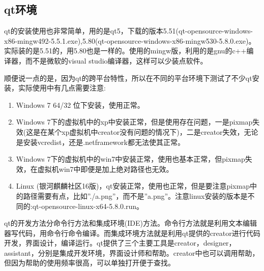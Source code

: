 \documentclass[11pt,twoside]{article} %
\begin{document}
\subsection{qt环境}
qt的安装使用也非常简单，用的是qt5，下载的版本5.51(qt-opensource-windows-x86-mingw492-5.5.1.exe),5.80(qt-opensource-windows-x86-mingw530-5.8.0.exe)。 实际装的是5.51的，用5.80也是一样的。使用的mingw版，利用的是gnu的c++编译器，而不是微软的visual studio编译器，这样可以少装点软件。

顺便说一点的是，因为qt的跨平台特性，所以在不同的平台环境下测试了不少qt安装，实际使用中有几点需要注意:
\begin{enumerate}
  \item Windows 7 64/32 位下安装，使用正常。
  \item Windows 7下的虚拟机中的xp中安装正常，但是使用存在问题，一是pixmap失效(这是在某个xp虚拟机中creator没有问题的情况下)，二是creator失效，无论是安装vcredist，还是.netframework都无法使其正常。
  \item Windows 7下的虚拟机中的win7中安装正常，使用也基本正常，但pixmap失效，在虚拟机win7中即便是加上绝对路径也无效。
  \item Linux (银河麒麟社区16版)，qt安装正常，使用也正常，但是要注意pixmap中的路径需要有点，比如”./a.png”，而不是”a.png”。注意linux安装的版本是不同的:qt-opensource-linux-x64-5.8.0.run。
\end{enumerate}

qt的开发方法分命令行方法和集成环境(IDE)方法。命令行方法就是利用文本编辑器写代码，用命令行命令编译。而集成环境方法就是利用qt提供的creator进行代码开发，界面设计，编译运行。qt提供了三个主要工具是creator，designer，assistant，分别是集成开发环境，界面设计师和帮助。creator中也可以调用帮助，但因为帮助的使用频率很高，可以单独打开便于查找。
\end{document}
